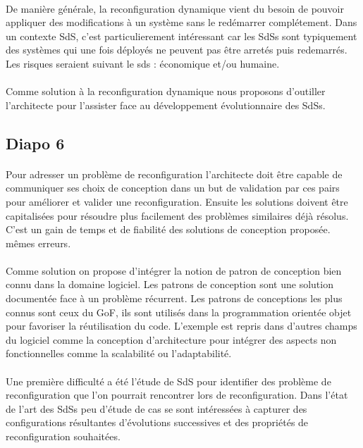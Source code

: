 \paragraph{}
De manière générale, la reconfiguration dynamique vient du besoin de
pouvoir appliquer des modifications à un système sans le redémarrer
complétement. Dans un contexte SdS, c'est particulierement intéressant
car les SdSs sont typiquement des systèmes qui une fois déployés ne
peuvent pas être arretés puis redemarrés. Les risques seraient suivant
le sds : économique et/ou humaine. 
 
\paragraph{} 
Comme solution à la reconfiguration dynamique nous proposons
d'outiller l'architecte pour l'assister face au développement
évolutionnaire des SdSs. 

\subsection{Diapo 6}

\paragraph{} 
Pour adresser un problème de reconfiguration l'architecte doit être
capable de communiquer ses choix de conception dans un but de
validation par ces pairs pour améliorer et valider une
reconfiguration. Ensuite les solutions doivent être capitalisées pour
résoudre plus facilement des problèmes similaires déjà résolus. C'est
un gain de temps et de fiabilité des solutions de conception proposée. 
mêmes erreurs. 

\paragraph{}
Comme solution on propose d'intégrer la notion de patron de conception
bien connu dans la domaine logiciel. Les patrons de conception sont
une solution documentée face à un problème récurrent. Les patrons de
conceptions les plus connus sont ceux du GoF, ils sont utilisés dans
la programmation orientée objet pour favoriser la réutilisation du
code. L'exemple est repris dans d'autres champs du logiciel comme la
conception d'architecture pour intégrer des aspects non fonctionnelles
comme la scalabilité ou l'adaptabilité. 

\paragraph{}
Une première difficulté a été l'étude de SdS pour identifier des
problème de reconfiguration que l'on pourrait rencontrer lors de
reconfiguration. Dans l'état de l'art des SdSs peu d'étude de cas se sont intéressées
à capturer des configurations résultantes d'évolutions successives et
des propriétés de reconfiguration souhaitées.

